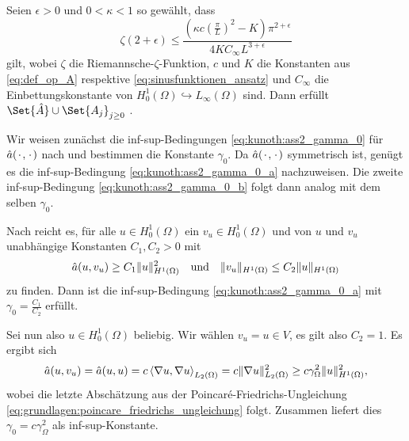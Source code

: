 \begin{Satz}
\label{satz:regularitaet_nachrechnen}
    Seien $\epsilon > 0$ und $0 < \kappa < 1$ so gewählt, dass
    \begin{equation}
        \zeta(2 + \epsilon) \leq \frac{(\kappa c \left( \frac{\pi}{L}  \right)^{2}  - K) \pi^{2 + \epsilon}}{4 K C_{\infty} L^{3 + \epsilon}}
    \end{equation}
    gilt,
    wobei $\zeta$ die Riemannsche-$\zeta$-Funktion, $c$ und $K$ die Konstanten aus \eqref{eq:def_op_A} respektive \eqref{eq:sinusfunktionen_ansatz} und $C_{\infty}$ die Einbettungskonstante von $H^{1}_{0}(\Omega) \hookrightarrow L_{\infty}(\Omega)$ sind.
    Dann erfüllt $\Set{\hat A} \cup \Set{ A_{j} }_{j \geq 0}$ .

    \begin{Beweis}
        Wir weisen zunächst die inf-sup-Bedingungen \eqref{eq:kunoth:ass2_gamma_0} für $\hat a({\mkern2mu\cdot\mkern2mu}, {\mkern2mu\cdot\mkern2mu})$ nach und bestimmen die Konstante $\gamma_{0}$.
        Da $\hat a({\mkern2mu\cdot\mkern2mu}, {\mkern2mu\cdot\mkern2mu})$ symmetrisch ist, genügt es die inf-sup-Bedingung \eqref{eq:kunoth:ass2_gamma_0_a} nachzuweisen. Die zweite inf-sup-Bedingung \eqref{eq:kunoth:ass2_gamma_0_b} folgt dann analog mit dem selben $\gamma_{0}$.

        Nach  reicht es, für alle $u \in H^{1}_{0}(\Omega)$ ein $v_{u} \in H^{1}_{0}(\Omega)$ und von $u$ und $v_{u}$ unabhängige Konstanten $C_{1}, C_{2} > 0$ mit
        \begin{equation}
            \hat a(u, v_{u}) \geq C_{1} \lVert u\rVert_{H^{1}(\Omega)}^{2} \quad \text{und} \quad \lVert v_{u}\rVert_{H^{1}(\Omega)} \leq C_{2} \lVert u\rVert_{H^{1}(\Omega)}
        \end{equation}
        zu finden.
        Dann ist die inf-sup-Bedingung \eqref{eq:kunoth:ass2_gamma_0_a} mit $\gamma_{0} = \frac{C_{1}}{C_{2}}$ erfüllt.

        Sei nun also $u \in H^{1}_{0}(\Omega)$ beliebig.
        Wir wählen $v_{u} = u \in V$, es gilt also $C_{2} = 1$.
        Es ergibt sich
        \begin{align}
            \hat a(u, v_{u}) = \hat a(u, u) = c \left\langle\nabla u,\nabla u\right\rangle_{L_{2}(\Omega)} = c \lVert\nabla u\rVert_{L_{2}(\Omega)}^{2} \geq c \gamma_{\Omega}^{2} \lVert u\rVert_{H^{1}(\Omega)}^{2},
        \end{align}
        wobei die letzte Abschätzung aus der Poincaré-Friedrichs-Ungleichung \eqref{eq:grundlagen:poincare_friedrichs_ungleichung} folgt.
        Zusammen liefert dies $\gamma_{0} = c \gamma_{\Omega}^{2}$ als inf-sup-Konstante.


\end{Beweis}
\end{Satz}
